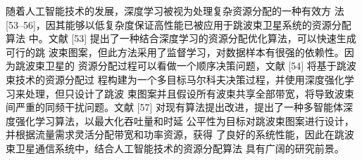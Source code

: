 随着人工智能技术的发展，深度学习被视为处理复杂资源分配的一种有效方
法 [53–56]，因其能够以低复杂度保证高性能已被应用于跳波束卫星系统的资源分配算法
中。文献 [53] 提出了一种结合深度学习的资源分配优化算法，可以快速生成可行的跳
波束图案，但此方法采用了监督学习，对数据样本有很强的依赖性。因为跳波束卫星的
资源分配过程可以看做一个顺序决策问题，文献 [54] 将基于跳波束技术的资源分配过
程构建为一个多目标马尔科夫决策过程，并使用深度强化学习来处理，但只设计了跳波
束图案并且假设所有波束共享全部带宽，将导致波束间严重的同频干扰问题。文献 [57]
对现有算法提出改进，提出了一种多智能体深度强化学习算法，以最大化吞吐量和时延
公平性为目标对跳波束图案进行设计，并根据流量需求灵活分配带宽和功率资源，获得
了良好的系统性能，因此在跳波束卫星通信系统中，结合人工智能技术的资源分配算法
具有广阔的研究前景。\par







